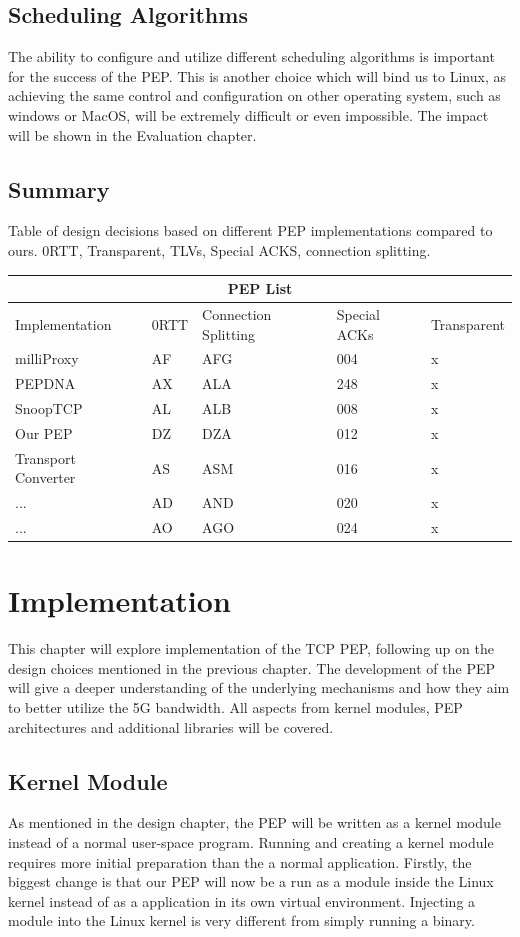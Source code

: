 \documentclass[a4paper,english, 11pt]{report}
\begin{document}
\section{Scheduling Algorithms}
The ability to configure and utilize different scheduling algorithms is important for the success of the PEP. This is another choice which will bind us to Linux, as achieving the same control and configuration on other operating system, such as windows or MacOS, will be extremely difficult or even impossible. The impact will be shown in the Evaluation chapter.



\section{Summary}

{Table of design decisions based on different PEP implementations compared to ours.}
{0RTT, Transparent, TLVs, Special ACKS, connection splitting.}\\
\begin{tabular}{ |p{4cm}||p{2cm}|p{2cm}|p{2cm}|p{2cm}| }
 \hline
 \multicolumn{5}{|c|}{PEP List} \\
 \hline
 Implementation& 0RTT &Connection Splitting &Special ACKs &Transparent\\
 \hline
 milliProxy   & AF    &AFG&   004 & x\\
 PEPDNA&   AX  & ALA   &248 & x\\
 SnoopTCP &AL & ALB&  008 & x\\
 Our PEP    &DZ & DZA&  012& x \\
 Transport Converter &   AS  & ASM&016& x\\
 ...& AD  & AND   &020& x\\
 ...& AO  & AGO&024& x\\
 \hline
\end{tabular}

\chapter{Implementation}
This chapter will explore implementation of the TCP PEP, following up on the design choices mentioned in the previous chapter. The development of the PEP will give a deeper understanding of the underlying mechanisms and how they aim to better utilize the 5G bandwidth. All aspects from kernel modules, PEP architectures and additional libraries will be covered.

\section{Kernel Module}
As mentioned in the design chapter, the PEP will be written as a kernel module instead of a normal user-space program. Running and creating a kernel module requires more initial preparation than the a normal application. Firstly, the biggest change is that our PEP will now be a run as a module inside the Linux kernel instead of as a application in its own virtual environment. Injecting a module into the Linux kernel is very different from simply running a binary.\\
\end{document}
